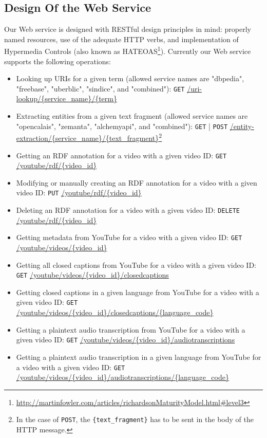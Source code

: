\documentclass{acm_proc_article-sp}
\begin{document}
\subsection{Design Of the Web Service}\label{sec:design}
Our Web service is designed with RESTful design principles in mind: properly named resources, use of the adequate HTTP verbs, and implementation of Hypermedia Controls (also known as HATEOAS\footnote{\url{http://martinfowler.com/articles/richardsonMaturityModel.html#level3}}). Currently our Web service supports the following operations:
\begin{itemize}
\item Looking up URIs for a given term (allowed service names are "dbpedia", "freebase", "uberblic", "sindice", and "combined"): \texttt{GET} \url{/uri-lookup/{service_name}/{term}} 
\item Extracting entities from a given text fragment (allowed service names are "opencalais", "zemanta", "alchemyapi", and "combined"): \texttt{GET} | \texttt{POST} \url{/entity-extraction/{service_name}/{text_fragment}}\footnote{In the case of \texttt{POST}, the \texttt{\{text\_fragment\}} has to be sent in the body of the HTTP message.}
\item Getting an RDF annotation for a video with a given video ID: \texttt{GET} \url{/youtube/rdf/{video_id}}
\item Modifying or manually creating an RDF annotation for a video with a given video ID: \texttt{PUT} \url{/youtube/rdf/{video_id}}
\item Deleting an RDF annotation for a video with a given video ID: \texttt{DELETE} \url{/youtube/rdf/{video_id}}
\item Getting metadata from YouTube for a video with a given video ID: \texttt{GET} \url{/youtube/videos/{video_id}}
\item Getting all closed captions from YouTube for a video with a given video ID: \texttt{GET} \url{/youtube/videos/{video_id}/closedcaptions}
\item Getting closed captions in a given language from YouTube for a video with a given video ID: \texttt{GET} \url{/youtube/videos/{video_id}/closedcaptions/{language_code}}
\item Getting a plaintext audio transcription from YouTube for a video with a given video ID: \texttt{GET} \url{/youtube/videos/{video_id}/audiotranscriptions}
\item Getting a plaintext audio transcription in a given language from YouTube for a video with a given video ID: \texttt{GET} \url{/youtube/videos/{video_id}/audiotranscriptions/{language_code}}
\end{itemize}
\end{document}
